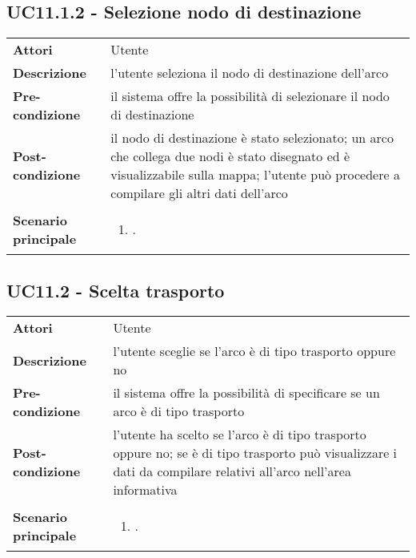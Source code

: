 \subsection{UC11.1.2 - Selezione nodo di destinazione} 
\label{sssec:UC11.1.2} 
\def\arraystretch{1.5}
\begin{tabularx}{\textwidth}{l|p{}}
	\rowcolor{I} \multicolumn{2}{c}{\color{white}\textbf{UC11.1.2 - Selezione nodo di destinazione}} \\
	\toprule
	\endhead
	\textbf{Attori} & Utente\\
	\textbf{Descrizione} & l'utente seleziona il nodo di destinazione dell'arco\\
	\textbf{Pre-condizione} & il sistema offre la possibilità di selezionare il nodo di destinazione\\
	\textbf{Post-condizione} & il nodo di destinazione è stato selezionato; un arco che collega due nodi è stato disegnato ed è visualizzabile sulla mappa; l'utente può procedere a compilare gli altri dati dell'arco\\
	\textbf{Scenario principale} & \vspace{-1.2em}\begin{enumerate}[leftmargin=*,noitemsep,nosep]
		\item \nameref{sssec:UC11.1.2}.
	\end{enumerate}\\
	\bottomrule
\end{tabularx}
\subsection{UC11.2 - Scelta trasporto} 
\label{sssec:UC11.2} 
\def\arraystretch{1.5}
\begin{tabularx}{\textwidth}{l|p{}}
	\rowcolor{I} \multicolumn{2}{c}{\color{white}\textbf{UC11.2 - Scelta trasporto}} \\
	\toprule
	\endhead
	\textbf{Attori} & Utente\\
	\textbf{Descrizione} & l'utente sceglie se l'arco è di tipo trasporto oppure no\\
	\textbf{Pre-condizione} & il sistema offre la possibilità di specificare se un arco è di tipo trasporto\\
	\textbf{Post-condizione} & l'utente ha scelto se l'arco è di tipo trasporto oppure no; se è di tipo trasporto può visualizzare i dati da compilare relativi all'arco nell'area informativa\\
	\textbf{Scenario principale} & \vspace{-1.2em}\begin{enumerate}[leftmargin=*,noitemsep,nosep]
		\item \nameref{sssec:UC11.2}.
	\end{enumerate}\\
	\bottomrule
\end{tabularx}
